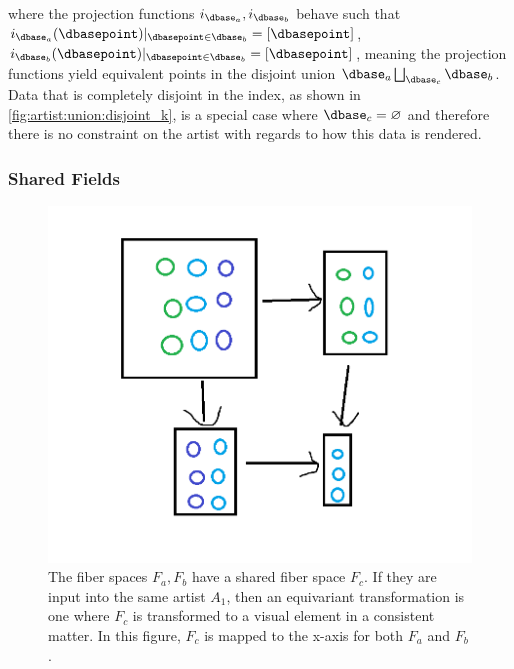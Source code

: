 \documentclass[10pt,journal,compsoc]{IEEEtran}
\theoremstyle{definition}
\theoremstyle{remark}
\begin{document}
where the projection functions $i_{\dbase_a},i_{\dbase_b}$ behave such that $i_{\dbase_a}(\dbasepoint)|_{\dbasepoint \in \dbase_b} = \left[\dbasepoint\right]$, $i_{\dbase_b}(\dbasepoint)|_{\dbasepoint \in \dbase_b} = \left[\dbasepoint\right]$, meaning the projection functions yield equivalent points in the disjoint union $\dbase_a \bigsqcup_{\dbase_c} \dbase_b$. Data that is completely disjoint in the index, as shown in \autoref{fig:artist:union:disjoint_k}, is a special case where $\dbase_c=\varnothing$ and therefore there is no constraint on the artist with regards to how this data is rendered. 

\subsubsection{Shared Fields}

\begin{figure}[h!]
  \includegraphics[width=\columnwidth]{intersection_f.png}
  \caption{The fiber spaces $F_a, F_b$ have a shared fiber space $F_c$. If they are input into the same artist $A_1$, then an equivariant transformation is one where $F_c$ is transformed to a visual element in a consistent matter. In this figure, $F_c$ is mapped to the x-axis for both $F_a$ and $F_b$.}
  \label{fig:artist:compose:union_fiber}
\end{figure}
\end{document}
